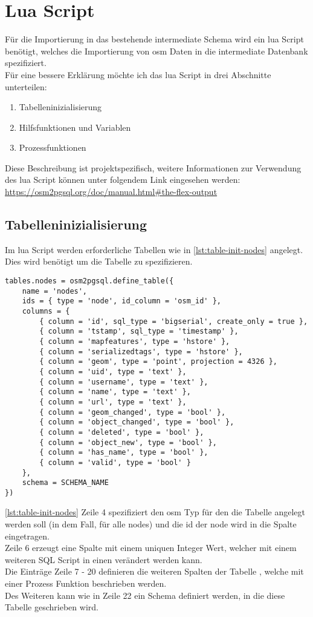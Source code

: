 \newpage
\section{Lua Script}
Für die Importierung in das bestehende intermediate Schema wird ein lua Script benötigt, welches die Importierung von osm Daten in die intermediate Datenbank spezifiziert.\\
Für eine bessere Erklärung möchte ich das lua Script in drei Abschnitte unterteilen:
\begin{enumerate}
	\item Tabelleninizialisierung
	\item Hilfsfunktionen und Variablen
	\item Prozessfunktionen
\end{enumerate}
Diese Beschreibung ist projektspezifisch, weitere Informationen zur Verwendung des lua Script können unter folgendem Link eingesehen werden: \\
\url{https://osm2pgsql.org/doc/manual.html#the-flex-output}
\subsection{Tabelleninizialisierung}\label{subsec:table-init}
Im lua Script werden erforderliche Tabellen wie in \autoref{lst:table-init-nodes} angelegt. Dies wird benötigt um die Tabelle zu spezifizieren.
\begin{lstlisting}[language={[5.0]Lua}, caption={Initialisierung eine Tabelle für alle nodes},label={lst:table-init-nodes}]
tables.nodes = osm2pgsql.define_table({
	name = 'nodes',						
	ids = { type = 'node', id_column = 'osm_id' },
	columns = {
		{ column = 'id', sql_type = 'bigserial', create_only = true },
		{ column = 'tstamp', sql_type = 'timestamp' },
		{ column = 'mapfeatures', type = 'hstore' },
		{ column = 'serializedtags', type = 'hstore' },
		{ column = 'geom', type = 'point', projection = 4326 },
		{ column = 'uid', type = 'text' },
		{ column = 'username', type = 'text' },
		{ column = 'name', type = 'text' },
		{ column = 'url', type = 'text' },
		{ column = 'geom_changed', type = 'bool' },
		{ column = 'object_changed', type = 'bool' },
		{ column = 'deleted', type = 'bool' },
		{ column = 'object_new', type = 'bool' },
		{ column = 'has_name', type = 'bool' },
		{ column = 'valid', type = 'bool' }
	},
	schema = SCHEMA_NAME
})
\end{lstlisting}
\autoref{lst:table-init-nodes} Zeile 4 spezifiziert den osm Typ für den die Tabelle angelegt werden soll (in dem Fall, für alle nodes) und die id der node wird in die Spalte  eingetragen.\\
Zeile 6 erzeugt eine Spalte mit einem uniquen Integer Wert, welcher mit einem weiteren SQL Script in einen  verändert werden kann.\\
Die Einträge Zeile 7 - 20 definieren die weiteren Spalten der Tabelle , welche mit einer Prozess Funktion beschrieben werden.\\
Des Weiteren kann wie in Zeile 22 ein Schema definiert werden, in die diese Tabelle geschrieben wird.

